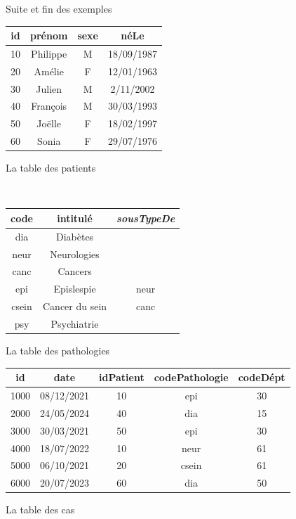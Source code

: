 \begin{frame}{Suite et fin des exemples}
 

\begin{minipage}[t]{7cm}
\begin{tabular}{c|c|c|c}
\textbf{id} & prénom & sexe & néLe \\ \hline
 10  &  Philippe & M & 18/09/1987\\
20 & Amélie & F & 12/01/1963\\
30 &Julien & M & 2/11/2002\\
40 & François & M & 30/03/1993\\
50 & Joëlle & F & 18/02/1997\\
60 & Sonia & F & 29/07/1976\\
\hline
\end{tabular}

La table des patients
\end{minipage} \hspace*{2mm} \
\begin{minipage}[t]{5cm}
\begin{tabular}{c|c|c}
\textbf{code} & intitulé & \textit{sousTypeDe} \\ \hline
dia  & Diabètes &  \\
neur & Neurologies & \\
canc & Cancers & \\
epi & Epislespie & neur \\
csein & Cancer du sein & canc\\
psy & Psychiatrie & \\
\hline
\end{tabular}
La table des pathologies
\end{minipage}

\vfill
\begin{center}
\begin{tabular}{c|c|c|c|c}
\textbf{id} & date & idPatient & codePathologie & codeDépt \\ \hline
1000  & 08/12/2021 & 10 & epi & 30\\
2000 &  24/05/2024 & 40 & dia & 15\\
3000 &  30/03/2021 & 50 & epi & 30\\
4000 &  18/07/2022 & 10 & neur & 61\\
5000 &  06/10/2021 & 20 & csein & 61\\
6000 &  20/07/2023 & 60 & dia & 50\\
\hline
\end{tabular}
La table des cas
\end{center} 
\end{frame}


